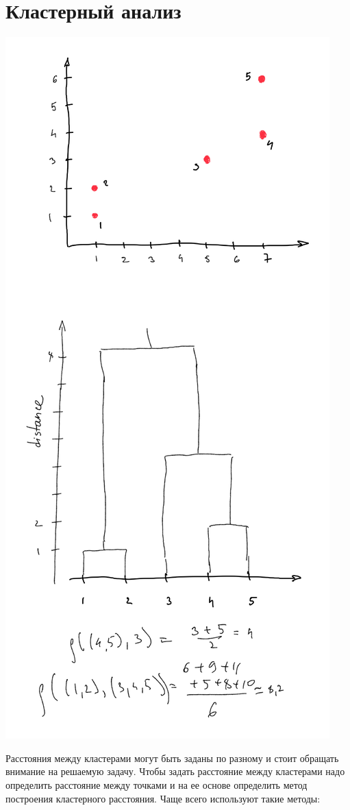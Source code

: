 \documentclass[a4paper, oneside]{book}
\begin{document}
\section{Кластерный анализ}
\begin{marginfigure}
    \includegraphics[width=1.1\columnwidth]{pics/dendrogram.pdf}
    \label{fig:boxplot}
\end{marginfigure}
Расстояния между кластерами могут быть заданы по разному и стоит обращать
внимание на решаемую задачу. Чтобы задать расстояние между кластерами надо
определить расстояние между точками и на ее основе определить метод построения
кластерного расстояния. Чаще всего используют такие методы:
\end{document}
